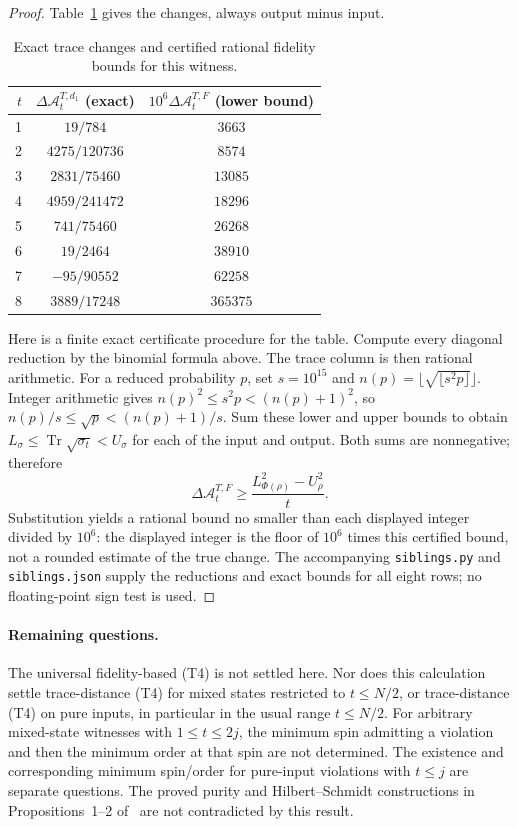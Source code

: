 \documentclass[11pt]{article}
\newcommand{\Tr}{\operatorname{Tr}}
\newcommand{\A}{\mathcal{A}}
\begin{document}
\begin{proof}
Table~\ref{tab:siblings} gives the changes, always output minus input.
\begin{table}[ht]
\centering
\begin{tabular}{rcc}
\toprule
$t$ & $\Delta\A_t^{T,d_1}$ (exact) & $10^6\Delta\A_t^{T,F}$ (lower bound)\\
\midrule
1 & $19/784$ & $3663$\\
2 & $4275/120736$ & $8574$\\
3 & $2831/75460$ & $13085$\\
4 & $4959/241472$ & $18296$\\
5 & $741/75460$ & $26268$\\
6 & $19/2464$ & $38910$\\
7 & $-95/90552$ & $62258$\\
8 & $3889/17248$ & $365375$\\
\bottomrule
\end{tabular}
\caption{Exact trace changes and certified rational fidelity bounds for this witness.}
\label{tab:siblings}
\end{table}

Here is a finite exact certificate procedure for the table. Compute every
diagonal reduction by the binomial formula above. The trace column is then
rational arithmetic. For a reduced probability $p$, set $s=10^{15}$ and
$n(p)=\lfloor\sqrt{\lfloor s^2p\rfloor}\rfloor$. Integer arithmetic gives
$n(p)^2\leq s^2p<(n(p)+1)^2$, so
$n(p)/s\leq\sqrt p<(n(p)+1)/s$.
Sum these lower and upper bounds to obtain $L_\sigma\leq
\Tr\sqrt{\sigma_t}<U_\sigma$ for each of the input and output.
Both sums are nonnegative; therefore
\[
 \Delta\A_t^{T,F}\geq
 \frac{L_{\Phi(\rho)}^2-U_\rho^2}{t}.
\]
Substitution yields a rational bound no smaller than each displayed integer
divided by $10^6$: the displayed integer is the floor of $10^6$ times this
certified bound, not a rounded estimate of the true change.
The accompanying \texttt{siblings.py} and
\texttt{siblings.json} supply the reductions and exact bounds for all eight
rows; no floating-point sign test is used.
\end{proof}

\paragraph{Remaining questions.}
The universal fidelity-based (T4) is not settled here. Nor does this calculation
settle trace-distance (T4) for mixed states restricted to $t\leq N/2$, or
trace-distance (T4) on pure inputs, in particular in the usual range
$t\leq N/2$. For arbitrary mixed-state witnesses with $1\leq t\leq2j$,
the minimum spin admitting a violation and then the minimum order at that
spin are not determined. The existence and corresponding minimum spin/order
for pure-input violations with $t\leq j$ are separate questions.
The proved purity and Hilbert--Schmidt constructions in
Propositions~1--2 of~\cite{DLMS} are not contradicted by this result.
\end{document}
